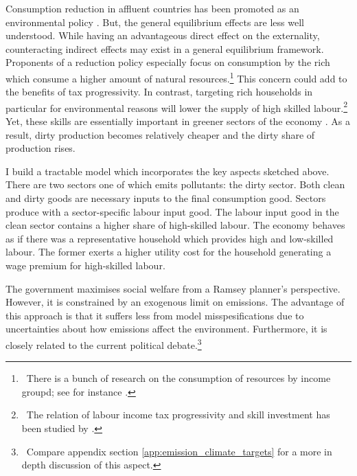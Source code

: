  Consumption reduction in affluent countries has been promoted as an environmental policy \citep{Schor2005SustainableReduction, Pullinger2014WorkingDesign, Arrow2004AreMuch}. But, the general equilibrium effects are less well understood.
While having an advantageous direct effect on the externality, counteracting indirect effects may exist in a general equilibrium framework. Proponents of a reduction policy especially focus on consumption by the rich which consume a higher amount of natural resources.\footnote{\ There is a bunch of research on the consumption of resources by income groupd; see for instance \cite{Sager2019IncomeCurves}.} %
This concern could add to the benefits of tax progressivity.
In contrast, targeting rich households in particular for environmental reasons will lower the supply of high skilled labour.\footnote{\ The relation of labour income tax progressivity and skill investment has been studied by \cite{Heathcote2017OptimalFramework}.} Yet, these skills are essentially important in greener sectors of the economy \citep{Consoli2016DoCapital}. As a result, dirty production becomes relatively cheaper and the dirty share of production rises. 

I build a tractable model which incorporates the key aspects sketched above. There are two sectors one of which emits pollutants: the dirty sector. Both clean and dirty goods are necessary inputs to the final consumption good. Sectors produce with a sector-specific labour input good. The labour input good in the clean sector contains a higher share of high-skilled labour. 
The economy behaves as if there was a representative household which provides high and low-skilled labour. The former exerts a higher utility cost for the household generating a wage premium for high-skilled labour. 

The government maximises social welfare from a Ramsey planner's perspective. However, it is constrained by an exogenous limit on emissions. The advantage of this approach is that it suffers less from  model misspesifications due to  uncertainties about how emissions affect the environment. Furthermore, it is closely related to the current political debate.\footnote{\ Compare appendix section \ref{app:emission_climate_targets} for a more in depth discussion of this aspect. } 

